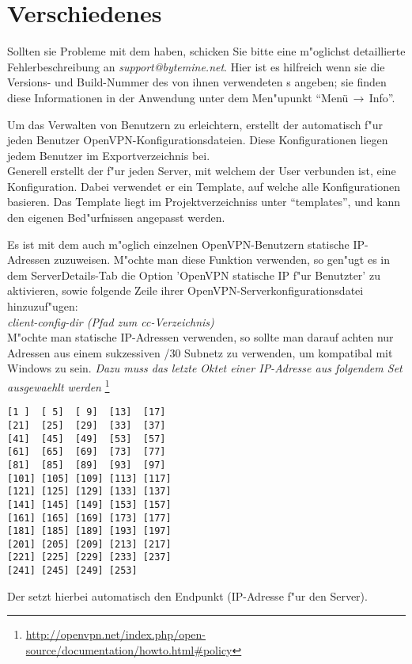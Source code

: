 \section{Verschiedenes}

Sollten sie Probleme mit dem \Nbm haben,
schicken Sie bitte eine m"oglichst detaillierte Fehlerbeschreibung
an \textsl{support@bytemine.net}.
Hier ist es hilfreich wenn sie die Versions- und Build-Nummer des von ihnen
verwendeten \Nbm s angeben; sie finden diese Informationen in der Anwendung unter dem Men"upunkt
``Men\"u$\,\rightarrow\,$Info''.

Um das Verwalten von Benutzern zu erleichtern, erstellt der \Nbm{} automatisch
 f"ur jeden Benutzer OpenVPN-Konfigurationsdateien. Diese Konfigurationen
liegen jedem Benutzer im Exportverzeichnis bei.\\
Generell erstellt der \Nbm{}  f"ur jeden Server, mit welchem der User
verbunden ist, eine Konfiguration. Dabei verwendet er ein Template, auf
welche alle Konfigurationen basieren. Das Template liegt im
Projektverzeichniss unter ``templates'', und kann den eigenen Bed"urfnissen
angepasst werden.

Es ist mit dem \Nbm{} auch m"oglich einzelnen OpenVPN-Benutzern statische
IP-Adressen zuzuweisen. M"ochte man diese Funktion verwenden, so gen"ugt es in
dem ServerDetails-Tab die Option 'OpenVPN statische IP f"ur Benutzter' zu
aktivieren, sowie folgende Zeile ihrer OpenVPN-Serverkonfigurationsdatei
hinzuzuf"ugen:\\[2mm]
\textit{client-config-dir (Pfad zum cc-Verzeichnis)}\\[2mm]
M"ochte man statische IP-Adressen verwenden, so sollte man darauf achten
nur Adressen aus einem sukzessiven /30 Subnetz zu verwenden, um
kompatibal mit Windows zu sein.
\textit{Dazu muss das letzte Oktet einer IP-Adresse aus folgendem Set ausgewaehlt
werden}
\footnote{\url{http://openvpn.net/index.php/open-source/documentation/howto.html\#policy}}
\begin{verbatim}
[1 ]  [ 5]  [ 9]  [13]  [17]
[21]  [25]  [29]  [33]  [37]
[41]  [45]  [49]  [53]  [57]
[61]  [65]  [69]  [73]  [77]
[81]  [85]  [89]  [93]  [97]
[101] [105] [109] [113] [117]
[121] [125] [129] [133] [137]
[141] [145] [149] [153] [157]
[161] [165] [169] [173] [177]
[181] [185] [189] [193] [197]
[201] [205] [209] [213] [217]
[221] [225] [229] [233] [237]
[241] [245] [249] [253]
\end{verbatim}
Der \Nbm{} setzt hierbei automatisch den Endpunkt (IP-Adresse f"ur
den Server).



